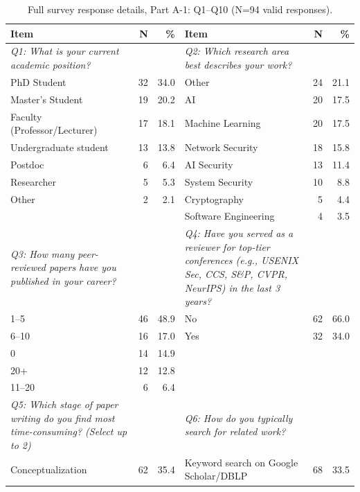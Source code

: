 \begin{table}[htbp]
\centering
\caption{Full survey response details, Part A-1: Q1--Q10 (N=94 valid responses).}
\label{tab:survey_details_full_a1}
\small
\begin{tabular}{p{6cm}rr|p{6cm}rr}
\toprule
\textbf{Item} & \textbf{N} & \textbf{\%} & \textbf{Item} & \textbf{N} & \textbf{\%} \\
\midrule
\textit{Q1: What is your current academic position?} & & & \textit{Q2: Which research area best describes your work?} & & \\
\rowcolor{tableRowLight}
PhD Student & 32 & 34.0 & Other & 24 & 21.1 \\
Master's Student & 19 & 20.2 & AI & 20 & 17.5 \\
\rowcolor{tableRowLight}
Faculty (Professor/Lecturer) & 17 & 18.1 & Machine Learning & 20 & 17.5 \\
Undergraduate student & 13 & 13.8 & Network Security & 18 & 15.8 \\
\rowcolor{tableRowLight}
Postdoc & 6 & 6.4 & AI Security & 13 & 11.4 \\
Researcher & 5 & 5.3 & System Security & 10 & 8.8 \\
\rowcolor{tableRowLight}
Other & 2 & 2.1 & Cryptography & 5 & 4.4 \\
 &  &  & Software Engineering & 4 & 3.5 \\
\midrule
\textit{Q3: How many peer-reviewed papers have you published in your career?} & & & \textit{Q4: Have you served as a reviewer for top-tier conferences (e.g., USENIX Sec, CCS, S\&P, CVPR, NeurIPS) in the last 3 years?} & & \\
\rowcolor{tableRowLight}
1--5 & 46 & 48.9 & No & 62 & 66.0 \\
6--10 & 16 & 17.0 & Yes & 32 & 34.0 \\
\rowcolor{tableRowLight}
0 & 14 & 14.9 &  &  &  \\
20+ & 12 & 12.8 &  &  &  \\
\rowcolor{tableRowLight}
11--20 & 6 & 6.4 &  &  &  \\
\midrule
\textit{Q5: Which stage of paper writing do you find most time-consuming? (Select up to 2)} & & & \textit{Q6: How do you typically search for related work?} & & \\
\rowcolor{tableRowLight}
Conceptualization & 62 & 35.4 & Keyword search on Google Scholar/DBLP & 68 & 33.5 \\

\end{tabular}
\end{table}
